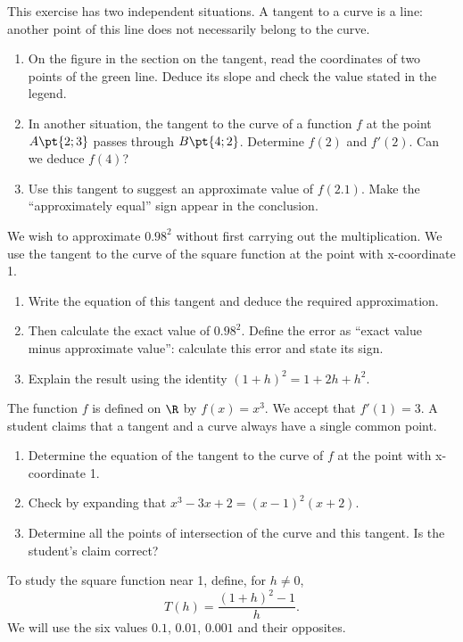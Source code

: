 This exercise has two independent situations. A tangent to a curve is a line: another point of this line does not necessarily belong to the curve.
\begin{enumerate}[label=\arabic*.]
\item On the figure in the section on the tangent, read the coordinates of two points of the green line. Deduce its slope and check the value stated in the legend.
\item In another situation, the tangent to the curve of a function $f$ at the point $A\pt{2;3}$ passes through $B\pt{4;2}$. Determine $f(2)$ and $f\prime(2)$. Can we deduce $f(4)$?
\item Use this tangent to suggest an approximate value of $f(\num{2,1})$. Make the ``approximately equal'' sign appear in the conclusion.
\end{enumerate}
We wish to approximate $\num{0,98}^2$ without first carrying out the multiplication. We use the tangent to the curve of the square function at the point with x-coordinate 1.
\begin{enumerate}[label=\arabic*.]
\item Write the equation of this tangent and deduce the required approximation.
\item Then calculate the exact value of $\num{0,98}^2$. Define the error as ``exact value minus approximate value'': calculate this error and state its sign.
\item Explain the result using the identity $(1+h)^2=1+2h+h^2$.
\end{enumerate}
The function $f$ is defined on $\R$ by $f(x)=x^3$. We accept that $f\prime(1)=3$. A student claims that a tangent and a curve always have a single common point.
\begin{enumerate}[label=\arabic*.]
\item Determine the equation of the tangent to the curve of $f$ at the point with x-coordinate 1.
\item Check by expanding that $x^3-3x+2=(x-1)^2(x+2)$.
\item Determine all the points of intersection of the curve and this tangent. Is the student's claim correct?
\end{enumerate}
To study the square function near 1, define, for $h\ne0$,\[T(h)=\dfrac{(1+h)^2-1}{h}.\]We will use the six values $\num{0,1}$, $\num{0,01}$, $\num{0,001}$ and their opposites.

